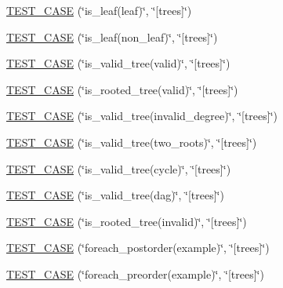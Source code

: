 \begin{DoxyCompactItemize}
\item 
\hyperlink{namespaceterraces_1_1tests_ac662737105ac077f2fa1757abe05e2a7}{T\+E\+S\+T\+\_\+\+C\+A\+SE} (\char`\"{}is\+\_\+leaf(leaf)\char`\"{}, \char`\"{}\mbox{[}trees\mbox{]}\char`\"{})
\item 
\hyperlink{namespaceterraces_1_1tests_af8e3364bb90d0e106aa6049a7f9d8813}{T\+E\+S\+T\+\_\+\+C\+A\+SE} (\char`\"{}is\+\_\+leaf(non\+\_\+leaf)\char`\"{}, \char`\"{}\mbox{[}trees\mbox{]}\char`\"{})
\item 
\hyperlink{namespaceterraces_1_1tests_aa482803c2007edddc7f42937de3b5a27}{T\+E\+S\+T\+\_\+\+C\+A\+SE} (\char`\"{}is\+\_\+valid\+\_\+tree(valid)\char`\"{}, \char`\"{}\mbox{[}trees\mbox{]}\char`\"{})
\item 
\hyperlink{namespaceterraces_1_1tests_a1dd6662b89a8e5a79af83ea67fa4f3cc}{T\+E\+S\+T\+\_\+\+C\+A\+SE} (\char`\"{}is\+\_\+rooted\+\_\+tree(valid)\char`\"{}, \char`\"{}\mbox{[}trees\mbox{]}\char`\"{})
\item 
\hyperlink{namespaceterraces_1_1tests_a4b77cfadf352f024173701bc7283d9e8}{T\+E\+S\+T\+\_\+\+C\+A\+SE} (\char`\"{}is\+\_\+valid\+\_\+tree(invalid\+\_\+degree)\char`\"{}, \char`\"{}\mbox{[}trees\mbox{]}\char`\"{})
\item 
\hyperlink{namespaceterraces_1_1tests_a8f57da0c1b0f4e67c4a1ef8cbc26fae0}{T\+E\+S\+T\+\_\+\+C\+A\+SE} (\char`\"{}is\+\_\+valid\+\_\+tree(two\+\_\+roots)\char`\"{}, \char`\"{}\mbox{[}trees\mbox{]}\char`\"{})
\item 
\hyperlink{namespaceterraces_1_1tests_a800f722181e2b2cc84c8b5178dc3b839}{T\+E\+S\+T\+\_\+\+C\+A\+SE} (\char`\"{}is\+\_\+valid\+\_\+tree(cycle)\char`\"{}, \char`\"{}\mbox{[}trees\mbox{]}\char`\"{})
\item 
\hyperlink{namespaceterraces_1_1tests_aaf936d53268927ed95a03b108b166472}{T\+E\+S\+T\+\_\+\+C\+A\+SE} (\char`\"{}is\+\_\+valid\+\_\+tree(dag)\char`\"{}, \char`\"{}\mbox{[}trees\mbox{]}\char`\"{})
\item 
\hyperlink{namespaceterraces_1_1tests_af3da7e414edda2c37e065e9f228b63c7}{T\+E\+S\+T\+\_\+\+C\+A\+SE} (\char`\"{}is\+\_\+rooted\+\_\+tree(invalid)\char`\"{}, \char`\"{}\mbox{[}trees\mbox{]}\char`\"{})
\item 
\hyperlink{namespaceterraces_1_1tests_a3829a284de87e99369da1368129310f6}{T\+E\+S\+T\+\_\+\+C\+A\+SE} (\char`\"{}foreach\+\_\+postorder(example)\char`\"{}, \char`\"{}\mbox{[}trees\mbox{]}\char`\"{})
\item 
\hyperlink{namespaceterraces_1_1tests_a8d1c9e9529bc697d2443cf415bac170c}{T\+E\+S\+T\+\_\+\+C\+A\+SE} (\char`\"{}foreach\+\_\+preorder(example)\char`\"{}, \char`\"{}\mbox{[}trees\mbox{]}\char`\"{})

\end{DoxyCompactItemize}
